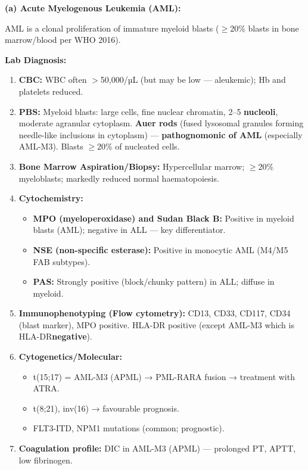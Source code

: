 \documentclass[11pt,a4paper]{article}
\begin{document}
\begin{ansbox}
\textbf{(a) Acute Myelogenous Leukemia (AML):}

AML is a clonal proliferation of immature myeloid blasts ($\geq$20\% blasts in bone marrow/blood per WHO 2016).

\textbf{Lab Diagnosis:}
\begin{enumerate}[leftmargin=*]
    \item \textbf{CBC:} WBC often $>$50,000/µL (but may be low --- aleukemic); Hb and platelets reduced.
    \item \textbf{PBS:} Myeloid blasts: large cells, fine nuclear chromatin, 2--5 \textbf{nucleoli}, moderate agranular cytoplasm. \textbf{Auer rods} (fused lysosomal granules forming needle-like inclusions in cytoplasm) --- \textbf{pathognomonic of AML} (especially AML-M3). Blasts $\geq$20\% of nucleated cells.
    \item \textbf{Bone Marrow Aspiration/Biopsy:} Hypercellular marrow; $\geq$20\% myeloblasts; markedly reduced normal haematopoiesis.
    \item \textbf{Cytochemistry:}
    \begin{itemize}
        \item \textbf{MPO (myeloperoxidase) and Sudan Black B:} Positive in myeloid blasts (AML); negative in ALL --- key differentiator.
        \item \textbf{NSE (non-specific esterase):} Positive in monocytic AML (M4/M5 FAB subtypes).
        \item \textbf{PAS:} Strongly positive (block/chunky pattern) in ALL; diffuse in myeloid.
    \end{itemize}
    \item \textbf{Immunophenotyping (Flow cytometry):} CD13, CD33, CD117, CD34 (blast marker), MPO positive. HLA-DR positive (except AML-M3 which is HLA-DR\textbf{negative}).
    \item \textbf{Cytogenetics/Molecular:}
    \begin{itemize}
        \item t(15;17) = AML-M3 (APML) → PML-RARA fusion → treatment with ATRA.
        \item t(8;21), inv(16) → favourable prognosis.
        \item FLT3-ITD, NPM1 mutations (common; prognostic).
    \end{itemize}
    \item \textbf{Coagulation profile:} DIC in AML-M3 (APML) --- prolonged PT, APTT, low fibrinogen.
\end{enumerate}


\end{ansbox}
\end{document}
